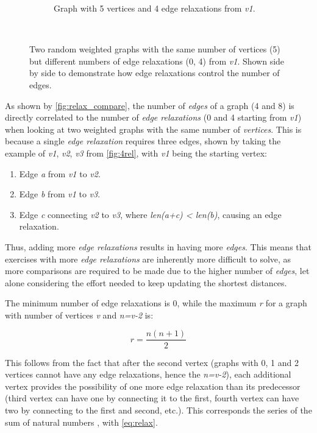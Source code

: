 \documentclass{l4proj}
\begin{document}
\begin{figure}
\begin{subfigure}[b]{0.49\textwidth}
        \caption{Graph with 5 vertices and 4 edge relaxations from \emph{v1}.}
        \label{fig:4rel}
    \end{subfigure}
    ~ %
    \caption{Two random weighted graphs with the same number of vertices (5) but different numbers of edge relaxations (0, 4) from \emph{v1}. Shown side by side to demonstrate how edge relaxations control the number of edges. }\label{fig:relax_compare}
\end{figure}

As shown by \autoref{fig:relax_compare}, the number of \emph{edges} of a graph (4 and 8) is directly correlated to the number of \emph{edge relaxations} (0 and 4 starting from \emph{v1}) when looking at two weighted graphs with the same number of \emph{vertices}. This is because a single \emph{edge relaxation} requires three edges, shown by taking the example of \emph{v1}, \emph{v2}, \emph{v3} from \autoref{fig:4rel}, with \emph{v1} being the starting vertex:
\begin{enumerate}
	\item
	Edge \emph{a} from \emph{v1} to \emph{v2}.
	\item
	Edge \emph{b} from \emph{v1} to \emph{v3}.
	\item
	Edge \emph{c} connecting \emph{v2} to \emph{v3}, where \emph{len(a+c) < len(b)}, causing an edge relaxation.
\end{enumerate}

Thus, adding more \emph{edge relaxations} results in having more \emph{edges}. This means that exercises with more \emph{edge relaxations} are inherently more difficult to solve, as more comparisons are required to be made due to the higher number of \emph{edges}, let alone considering the effort needed to keep updating the shortest distances. 

The minimum number of edge relaxations is 0, while the maximum \emph{r} for a graph with number of vertices \emph{v} and \emph{n=v-2} is:

\begin{equation}
	\label{eq:relax}
	r = \frac{n (n + 1)}{2}
\end{equation}

This follows from the fact that after the second vertex (graphs with 0, 1 and 2 vertices cannot have any edge relaxations, hence the \emph{n=v-2}), each additional vertex provides the possibility of one more edge relaxation than its predecessor (third vertex can have one by connecting it to the first, fourth vertex can have two by connecting to the first and second, etc.). This corresponds the series of the sum of natural numbers \cite{a}, with \autoref{eq:relax}.
\end{document}
